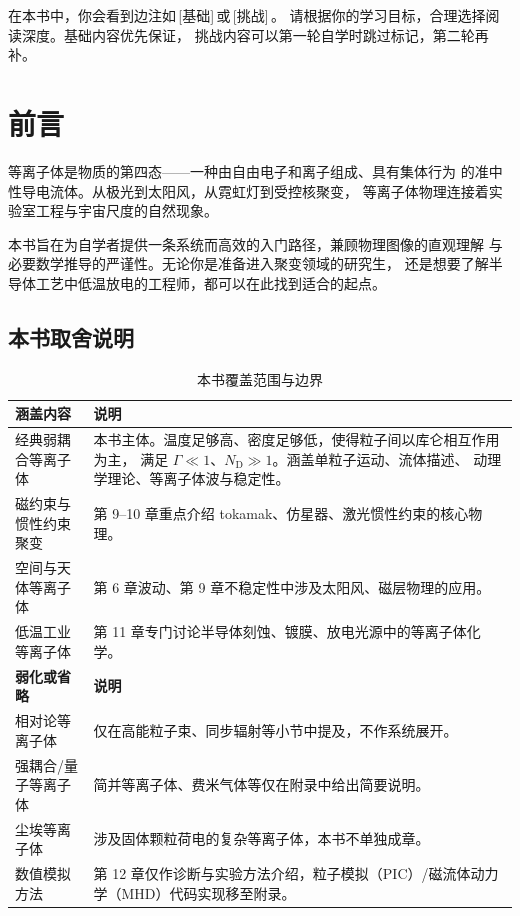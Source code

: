 \documentclass[12pt,a4paper,openany,oneside]{book}
\begin{document}
\begin{miniquiz}
在本书中，你会看到边注如\,[基础]\,或\,[挑战]\,。
请根据你的学习目标，合理选择阅读深度。基础内容优先保证，
挑战内容可以第一轮自学时跳过标记，第二轮再补。
\end{miniquiz}



\newpage
\chapter*{前言}

等离子体是物质的第四态——一种由自由电子和离子组成、具有集体行为
的准中性导电流体。从极光到太阳风，从霓虹灯到受控核聚变，
等离子体物理连接着实验室工程与宇宙尺度的自然现象。

本书旨在为自学者提供一条系统而高效的入门路径，兼顾物理图像的直观理解
与必要数学推导的严谨性。无论你是准备进入聚变领域的研究生，
还是想要了解半导体工艺中低温放电的工程师，都可以在此找到适合的起点。


\section*{本书取舍说明}

\begin{table}[htbp]
\centering
\caption{本书覆盖范围与边界}
\begin{tabular}{@{}lp{10cm}@{}}
\toprule
\textbf{涵盖内容} & \textbf{说明} \\
\midrule
经典弱耦合等离子体 & 本书主体。温度足够高、密度足够低，使得粒子间以库仑相互作用为主，
满足 $\Gamma\ll 1$、$N_\mathrm{D}\gg 1$。涵盖单粒子运动、流体描述、
动理学理论、等离子体波与稳定性。 \\
磁约束与惯性约束聚变 & 第 9--10 章重点介绍 tokamak、仿星器、激光惯性约束的核心物理。 \\
空间与天体等离子体 & 第 6 章波动、第 9 章不稳定性中涉及太阳风、磁层物理的应用。 \\
低温工业等离子体 & 第 11 章专门讨论半导体刻蚀、镀膜、放电光源中的等离子体化学。 \\
\midrule
\textbf{弱化或省略} & \textbf{说明} \\
\midrule
相对论等离子体 & 仅在高能粒子束、同步辐射等小节中提及，不作系统展开。 \\
强耦合/量子等离子体 & 简并等离子体、费米气体等仅在附录中给出简要说明。 \\
尘埃等离子体 & 涉及固体颗粒荷电的复杂等离子体，本书不单独成章。 \\
数值模拟方法 & 第 12 章仅作诊断与实验方法介绍，粒子模拟（PIC）/磁流体动力学（MHD）代码实现移至附录。 \\
\bottomrule
\end{tabular}
\end{table}
\end{document}
